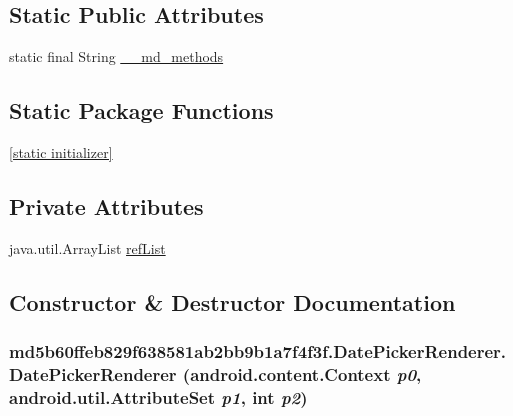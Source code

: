 \subsection*{Static Public Attributes}
\begin{CompactItemize}
\item 
static final String \hyperlink{classmd5b60ffeb829f638581ab2bb9b1a7f4f3f_1_1_date_picker_renderer_db56115e96abb1e11b6f6ceebbadb704}{\_\-\_\-md\_\-methods}
\end{CompactItemize}
\subsection*{Static Package Functions}
\begin{CompactItemize}
\item 
\hyperlink{classmd5b60ffeb829f638581ab2bb9b1a7f4f3f_1_1_date_picker_renderer_d5a159d87c6505feeea28c86f60c8407}{\mbox{[}static initializer\mbox{]}}
\end{CompactItemize}
\subsection*{Private Attributes}
\begin{CompactItemize}
\item 
java.util.ArrayList \hyperlink{classmd5b60ffeb829f638581ab2bb9b1a7f4f3f_1_1_date_picker_renderer_5c0de23da8ef6f756d8fd093f26c30c6}{refList}
\end{CompactItemize}


\subsection{Constructor \& Destructor Documentation}
\hypertarget{classmd5b60ffeb829f638581ab2bb9b1a7f4f3f_1_1_date_picker_renderer_9c9f3897fd07153d0786f2c0cd7f9137}{
\subsubsection[{DatePickerRenderer}]{\setlength{\rightskip}{0pt plus 5cm}md5b60ffeb829f638581ab2bb9b1a7f4f3f.DatePickerRenderer.DatePickerRenderer (android.content.Context {\em p0}, \/  android.util.AttributeSet {\em p1}, \/  int {\em p2})}}
\label{classmd5b60ffeb829f638581ab2bb9b1a7f4f3f_1_1_date_picker_renderer_9c9f3897fd07153d0786f2c0cd7f9137}


